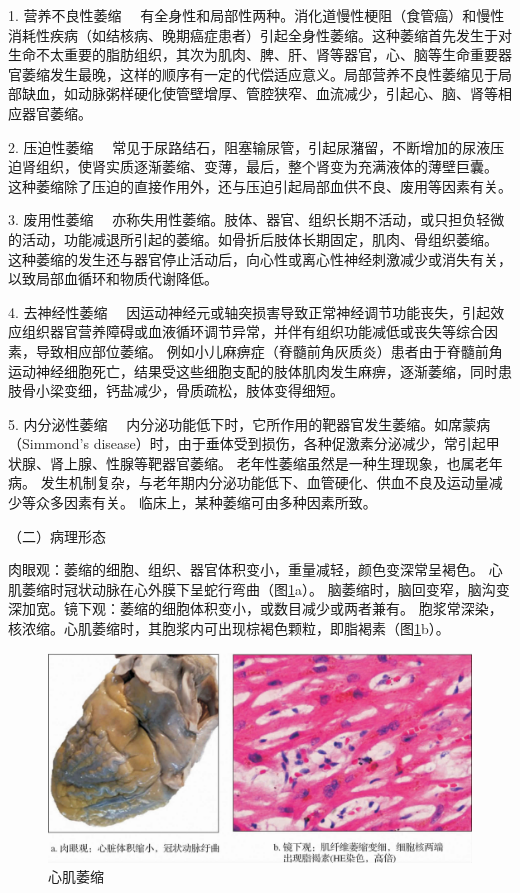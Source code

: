 {1. 营养不良性萎缩}
　有全身性和局部性两种。消化道慢性梗阻（食管癌）和慢性消耗性疾病（如结核病、晚期癌症患者）引起全身性萎缩。这种萎缩首先发生于对生命不太重要的脂肪组织，其次为肌肉、脾、肝、肾等器官，心、脑等生命重要器官萎缩发生最晚，这样的顺序有一定的代偿适应意义。局部营养不良性萎缩见于局部缺血，如动脉粥样硬化使管壁增厚、管腔狭窄、血流减少，引起心、脑、肾等相应器官萎缩。

{2. 压迫性萎缩}
　常见于尿路结石，阻塞输尿管，引起尿潴留，不断增加的尿液压迫肾组织，使肾实质逐渐萎缩、变薄，最后，整个肾变为充满液体的薄壁巨囊。
这种萎缩除了压迫的直接作用外，还与压迫引起局部血供不良、废用等因素有关。

{3. 废用性萎缩}
　亦称失用性萎缩。肢体、器官、组织长期不活动，或只担负轻微的活动，功能减退所引起的萎缩。如骨折后肢体长期固定，肌肉、骨组织萎缩。
这种萎缩的发生还与器官停止活动后，向心性或离心性神经刺激减少或消失有关，以致局部血循环和物质代谢降低。

{4. 去神经性萎缩}
　因运动神经元或轴突损害导致正常神经调节功能丧失，引起效应组织器官营养障碍或血液循环调节异常，并伴有组织功能减低或丧失等综合因素，导致相应部位萎缩。
例如小儿麻痹症（脊髓前角灰质炎）患者由于脊髓前角运动神经细胞死亡，结果受这些细胞支配的肢体肌肉发生麻痹，逐渐萎缩，同时患肢骨小梁变细，钙盐减少，骨质疏松，肢体变得细短。

{5. 内分泌性萎缩}
　内分泌功能低下时，它所作用的靶器官发生萎缩。如席蒙病（Simmond's
disease）时，由于垂体受到损伤，各种促激素分泌减少，常引起甲状腺、肾上腺、性腺等靶器官萎缩。
老年性萎缩虽然是一种生理现象，也属老年病。
发生机制复杂，与老年期内分泌功能低下、血管硬化、供血不良及运动量减少等众多因素有关。
临床上，某种萎缩可由多种因素所致。

{（二）病理形态}

肉眼观：萎缩的细胞、组织、器官体积变小，重量减轻，颜色变深常呈褐色。
心肌萎缩时冠状动脉在心外膜下呈蛇行弯曲（图\ref{fig1-1}a）。
脑萎缩时，脑回变窄，脑沟变深加宽。镜下观：萎缩的细胞体积变小，或数目减少或两者兼有。
胞浆常深染，核浓缩。心肌萎缩时，其胞浆内可出现棕褐色颗粒，即脂褐素（图\ref{fig1-1}b）。
\begin{figure}[!htbp]
	\centering
        \includegraphics[width=.8\textwidth]{./images/Image00002.jpg}
	\caption{心肌萎缩}
	\label{fig1-1} 
	\end{figure} 


